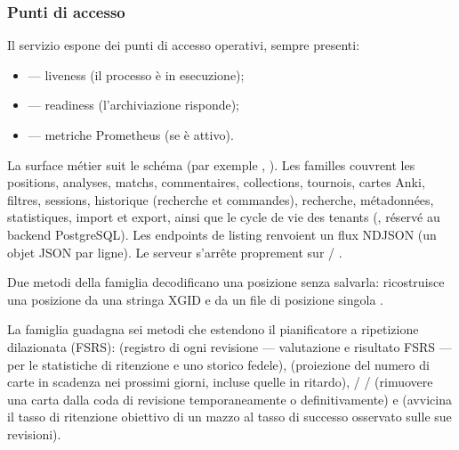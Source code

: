\documentclass[letterpaper,10pt,italian]{sphinxmanual}
\begin{document}
\subsubsection{Punti di accesso}
\label{\detokenize{mode_headless:points-d-acces}}
\sphinxAtStartPar
Il servizio espone dei punti di accesso operativi, sempre presenti:
\begin{itemize}
\item {} 
\sphinxAtStartPar
{} — liveness (il processo è in esecuzione);

\item {} 
\sphinxAtStartPar
{} — readiness (l’archiviazione risponde);

\item {} 
\sphinxAtStartPar
{} — metriche Prometheus (se  è attivo).

\end{itemize}

\sphinxAtStartPar
La surface métier suit le schéma  (par exemple
, ). Les familles couvrent les
positions, analyses, matchs, commentaires, collections, tournois, cartes Anki,
filtres, sessions, historique (recherche et commandes), recherche,
métadonnées, statistiques, import et export, ainsi que le cycle de vie des
tenants (, réservé au backend PostgreSQL). Les endpoints de
listing renvoient un flux NDJSON (un objet JSON par ligne). Le serveur
s’arrête proprement sur  / .

\sphinxAtStartPar
Due metodi della famiglia  decodificano una posizione senza salvarla:  ricostruisce una posizione da una stringa XGID e  da un file di posizione singola .

\sphinxAtStartPar
La famiglia  guadagna sei metodi che estendono il pianificatore a ripetizione dilazionata (FSRS):  (registro di ogni revisione — valutazione e risultato FSRS — per le statistiche di ritenzione e uno storico fedele),  (proiezione del numero di carte in scadenza nei prossimi giorni, incluse quelle in ritardo),  /  /  (rimuovere una carta dalla coda di revisione temporaneamente o definitivamente) e  (avvicina il tasso di ritenzione obiettivo di un mazzo al tasso di successo osservato sulle sue revisioni).
\end{document}
